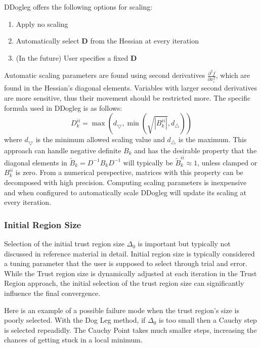 \documentclass[peerreview,compsoc,onecolumn]{IEEEtran}
\newenvironment{enumargin}[1]{\begin{enumerate}[leftmargin=#1\textwidth , rightmargin=#1\textwidth]}{\end{enumerate}}
\begin{document}
DDogleg offers the following options for scaling:
\begin{enumargin}{0.2}
\item Apply no scaling
\item Automatically select $\bm{D}$ from the Hessian at every iteration
\item (In the future) User specifies a fixed $\bm{D}$ 
\end{enumargin}
Automatic scaling parameters are found using second derivatives $\frac{\partial^2 f}{\partial x^2_i}$, which are found in the Hessian's diagonal elements. Variables with larger second derivatives are more sensitive, thus their movement should be restricted more. The specific formula used in DDogleg is as follows:
\begin{equation}
D_k^{ii} = \max\left( d_{\bigtriangledown},\min\left( \sqrt{|B_k^{ii}|} , d_{\bigtriangleup} \right)\right)
\end{equation}
where $d_{\bigtriangledown}$ is the minimum allowed scaling value and $d_{\bigtriangleup}$ is the maximum. This approach can handle negative definite $B_k$ and has the desirable property \cite{dennis1996} that the diagonal elements in $\tilde{B}_k = D^{-1}B_k D^{-1}$ will typically be $\tilde{B}_k^{ii} \approx 1$, unless clamped or $B_k^{ii}$ is zero. From a numerical perspective, matrices with this property can be decomposed with high precision. Computing scaling parameters is inexpensive and when configured to automatically scale DDogleg will update its scaling at every iteration.

\subsubsection{Initial Region Size} 
\label{section:init_region_size}

Selection of the initial trust region size $\Delta_0$ is important but typically not discussed in reference material \cite{fletcher1987,numopt2006,IMM2004} in detail. Initial region size is typically considered a tuning parameter that the user is supposed to select through trial and error. While the Trust region size is dynamically adjusted at each iteration in the Trust Region approach, the initial selection of the trust region size can significantly influence the final convergence.

Here is an example of a possible failure mode when the trust region's size is poorly selected. With the Dog Leg method, if $\Delta_0$ is too small then a Cauchy step is selected repeadidly. The Cauchy Point takes much smaller steps, increasing the chances of getting stuck in a local minimum.
\end{document}
